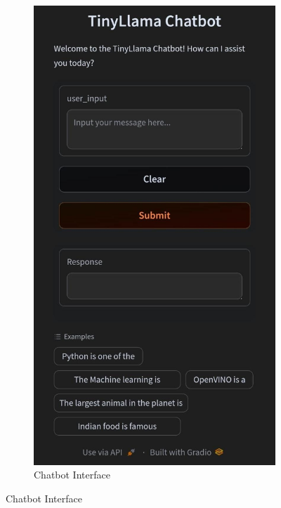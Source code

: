 \documentclass{josis}
\begin{document}
\begin{figure}[H]
\centering
\begin{subfigure}[b]{0.45\textwidth}
    \centering
    \includegraphics[width=\textwidth]{cove.jpg}
    \caption{Chatbot Interface}
    \label{fig:inference}
\end{subfigure}

\end{figure}
\end{document}
